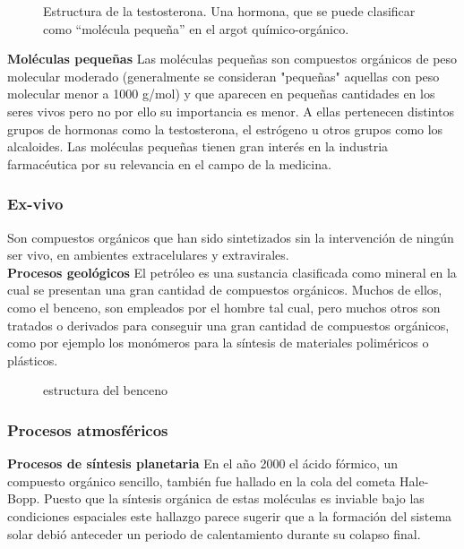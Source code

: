 \documentclass[12pt,letterpaper]{article}
\begin{document}
\begin{figure}[h]
	\centering
	\caption{Estructura de la testosterona. Una hormona, que se puede clasificar como ``molécula pequeña'' en el argot químico-orgánico.}
\end{figure}

\noindent \textbf{Moléculas pequeñas} \quad Las moléculas pequeñas son compuestos orgánicos de peso molecular moderado (generalmente se consideran "pequeñas" aquellas con peso molecular menor a 1000 g/mol) y que aparecen en pequeñas can\-ti\-da\-des en los seres vivos pero no por ello su importancia es menor. A ellas pertenecen distintos grupos de hormonas como la testosterona, el estrógeno u otros grupos como los alcaloides. Las moléculas pequeñas tienen gran interés en la industria farmacéutica por su relevancia en el campo de la medicina.

\subsubsection{Ex-vivo}

Son compuestos orgánicos que han sido sintetizados sin la intervención de ningún ser vivo, en ambientes extracelulares y extravirales.
\\

\noindent \textbf{Procesos geológicos} \quad El petróleo es una sustancia clasificada como mineral en la cual se presentan una gran cantidad de compuestos orgánicos. Muchos de ellos, como el benceno, son empleados por el hombre tal cual, pe\-ro muchos otros son tratados o derivados para conseguir una gran cantidad de compuestos orgánicos, como por ejemplo los monómeros para la síntesis de materiales poliméricos o plásticos.
\begin{figure}[h]
	\centering
	\caption{estructura del benceno}
\end{figure}

\subsubsection*{Procesos atmosféricos}

\noindent \textbf{Procesos de síntesis planetaria} \quad En el año 2000 el ácido fórmico, un compuesto orgánico sencillo, también fue hallado en la cola del cometa Hale-Bopp. Puesto que la síntesis orgánica de estas moléculas es inviable bajo las condiciones espaciales este hallazgo parece sugerir que a la formación del sistema solar debió anteceder un periodo de calentamiento durante su colapso final.
\end{document}
